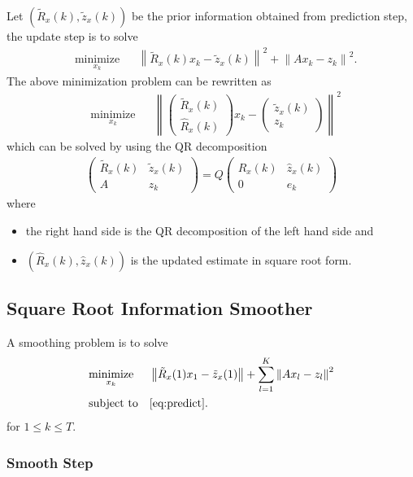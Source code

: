 \documentclass[microtype]{gtpart}     %
\theoremstyle{definition}
\newcommand{\norm}[1]{\left\lVert#1\right\rVert}
\begin{document}
Let $(\tilde{R}_x(k), \tilde{z}_x(k))$ be the prior information obtained from prediction step, 
the update step is to solve
\begin{align*}
	& \underset{x_k}{\text{minimize}} & &\norm{\tilde{R}_x(k)x_k - \tilde{z}_x(k)}^2 + \norm{Ax_k - z_k}^2.
\end{align*}
The above minimization problem can be rewritten as
\begin{align*}
	& \underset{x_k}{\text{minimize}} & &\norm{
	\begin{pmatrix}
	\tilde{R}_x(k) \\ \hat{R}_x(k)
	\end{pmatrix}x_k - 
	\begin{pmatrix}
	\tilde{z}_x(k) \\  z_k
	\end{pmatrix}}^2
\end{align*}
which can be solved by using the QR decomposition
\begin{align*}
	\begin{pmatrix}
		\tilde{R}_x(k) &\tilde{z}_x(k) \\ 
		A &z_k
	\end{pmatrix} = Q
	\begin{pmatrix}
		\hat{R}_x(k) &\hat{z}_x(k) \\
		0 &e_k
	\end{pmatrix}
\end{align*}
where
\begin{itemize}
	\item the right hand side is the QR decomposition of the left hand side and
	\item $(\hat{R}_x(k), \hat{z}_x(k))$ is the updated estimate in square root form.
\end{itemize}

\subsection{Square Root Information Smoother}

A smoothing problem is to solve
\begin{align*}
& \underset{x_k}{\text{minimize}} & & \norm{\tilde{R}_x(1)x_1 - \tilde{z}_x(1)} + \sum_{l=1}^{K}\norm{Ax_l - z_l}^2 \\
& \text{subject to} & & \cref{eq:predict}.
\end{align*}
for $1\leq k \leq T$.

\subsubsection{Smooth Step}
\end{document}
